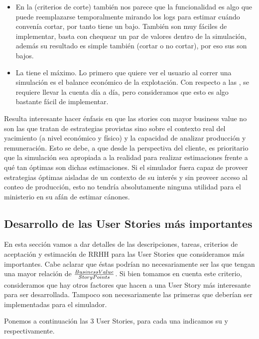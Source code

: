 \begin{itemize}
  \item En la  (criterios de corte) también nos parece que la funcionalidad es algo que puede reemplazarse temporalmente mirando los logs para estimar cuándo convenía cortar, por tanto tiene un \BV{} bajo. También son muy fáciles de implementar, basta con chequear un par de valores dentro de la simulación, además su resultado es simple también (cortar o no cortar), por eso sus \SP{} son bajos. 

  \item La  tiene el \BV{} máximo. Lo primero que quiere ver el usuario al correr una simulación es el balance económico de la explotación. Con respecto a las \SP{}, se requiere llevar la cuenta día a día, pero consideramos que esto es algo bastante fácil de implementar.
\end{itemize}

Resulta interesante hacer énfasis en que las stories con mayor business value no son las que tratan de estrategias provistas sino sobre el contexto real del yacimiento (a nivel económico y físico) y la capacidad de analizar producción y remuneración. Esto se debe, a que desde la perspectiva del cliente, es prioritario que la simulación sea apropiada a la realidad para realizar estimaciones frente a qué tan óptimas son dichas estimaciones. Si el simulador fuera capaz de proveer estrategias óptimas aisladas de un contexto de su interés y sin proveer acceso al conteo de producción, esto no tendría absolutamente ninguna utilidad para el ministerio en su afán de estimar cánones.

\newpage
\subsection{Desarrollo de las User Stories más importantes}

En esta sección vamos a dar detalles de las descripciones, tareas, criterios de aceptación y estimación de RRHH para las User Stories que consideramos más importantes. Cabe aclarar que éstas podrían no necesariamente ser las que tengan una mayor relación de \( \frac{Business Value{}}{Story Points{}} \). Si bien tomamos en cuenta este criterio, consideramos que hay otros factores que hacen a una User Story más interesante para ser desarrollada. Tampoco son necesariamente las primeras que deberían ser implementadas para el simulador. 

Ponemos a continuación las 3 User Stories, para cada una indicamos su
\BV{} y \SP{} respectivamente.

